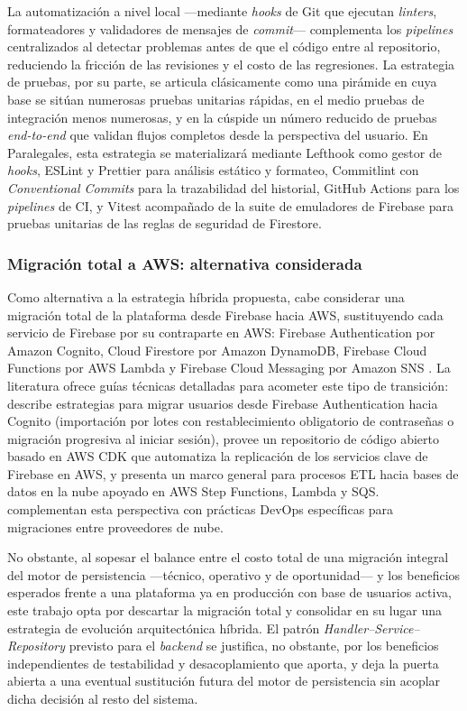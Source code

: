 La automatización a nivel local —mediante \textit{hooks} de Git que ejecutan \textit{linters}, formateadores y validadores de mensajes de \textit{commit}— complementa los \textit{pipelines} centralizados al detectar problemas antes de que el código entre al repositorio, reduciendo la fricción de las revisiones y el costo de las regresiones. La estrategia de pruebas, por su parte, se articula clásicamente como una pirámide en cuya base se sitúan numerosas pruebas unitarias rápidas, en el medio pruebas de integración menos numerosas, y en la cúspide un número reducido de pruebas \textit{end-to-end} que validan flujos completos desde la perspectiva del usuario. En Paralegales, esta estrategia se materializará mediante Lefthook como gestor de \textit{hooks}, ESLint y Prettier para análisis estático y formateo, Commitlint con \textit{Conventional Commits} para la trazabilidad del historial, GitHub Actions para los \textit{pipelines} de CI, y Vitest acompañado de la suite de emuladores de Firebase para pruebas unitarias de las reglas de seguridad de Firestore.

\subsubsection{Migración total a AWS: alternativa considerada}

Como alternativa a la estrategia híbrida propuesta, cabe considerar una migración total de la plataforma desde Firebase hacia AWS, sustituyendo cada servicio de Firebase por su contraparte en AWS: Firebase Authentication por Amazon Cognito, Cloud Firestore por Amazon DynamoDB, Firebase Cloud Functions por AWS Lambda y Firebase Cloud Messaging por Amazon SNS \cite{Michael2021}. La literatura ofrece guías técnicas detalladas para acometer este tipo de transición: \textcite{Hall2017} describe estrategias para migrar usuarios desde Firebase Authentication hacia Cognito (importación por lotes con restablecimiento obligatorio de contraseñas o migración progresiva al iniciar sesión), \textcite{Shank2021} provee un repositorio de código abierto basado en AWS CDK que automatiza la replicación de los servicios clave de Firebase en AWS, y \textcite{Kansara2024} presenta un marco general para procesos ETL hacia bases de datos en la nube apoyado en AWS Step Functions, Lambda y SQS. \textcite{Kyadasu2025} complementan esta perspectiva con prácticas DevOps específicas para migraciones entre proveedores de nube.

No obstante, al sopesar el balance entre el costo total de una migración integral del motor de persistencia —técnico, operativo y de oportunidad— y los beneficios esperados frente a una plataforma ya en producción con base de usuarios activa, este trabajo opta por descartar la migración total y consolidar en su lugar una estrategia de evolución arquitectónica híbrida. El patrón \textit{Handler--Service--Repository} previsto para el \textit{backend} se justifica, no obstante, por los beneficios independientes de testabilidad y desacoplamiento que aporta, y deja la puerta abierta a una eventual sustitución futura del motor de persistencia sin acoplar dicha decisión al resto del sistema.
